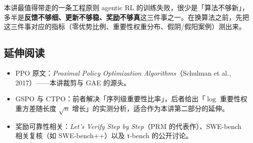 \documentclass[a4paper]{article}
\begin{document}
\begin{importantbox}{本讲最值得带走的一条工程原则}
agentic RL 的训练失败，很少是「算法不够新」，多半是\textbf{反馈不够细、更新不够稳、奖励不够真}这三件事之一。在换算法之前，先把这三件事对应的指标（零优势比例、重要性权重分布、假阴/假阳案例）测出来。
\end{importantbox}

\subsection{延伸阅读}

\begin{itemize}
\item PPO 原文：\emph{Proximal Policy Optimization Algorithms}（Schulman et al., 2017）——本讲裁剪与 GAE 的源头。
\item GSPO 与 CTPO：前者解决「序列级重要性比率」，后者给出「$\log$ 重要性权重方差随长度 $\sqrt{n}$ 增长」的实测分析，适合作为本讲第二部分的延伸。
\item 奖励可靠性相关：\emph{Let's Verify Step by Step}（PRM 的代表作）、SWE-bench 相关复核（如 SWE-bench++）以及 τ-bench 的公开讨论。
\end{itemize}
\end{document}
